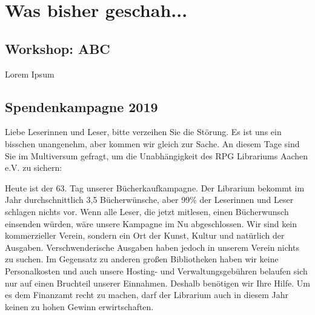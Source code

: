
%



%






%



\makemultititle
%

\section{Was bisher geschah...}

\subsection{Workshop: ABC}
Lorem Ipsum

\subsection{Spendenkampagne 2019}
Liebe Leserinnen und Leser, bitte verzeihen Sie die Störung. Es ist uns ein bisschen unangenehm, aber kommen wir gleich zur Sache. An diesem Tage sind Sie im Multiversum gefragt, um die Unabhängigkeit des RPG Librariums Aachen e.V. zu sichern:

Heute ist der 63. Tag unserer Bücherkaufkampagne. Der Librarium bekommt im Jahr durchschnittlich 3,5 Bücherwünsche, aber 99\% der Leserinnen und Leser schlagen nichts vor. Wenn alle Leser, die jetzt mitlesen, einen Bücherwunsch einsenden würden, wäre unsere Kampagne im Nu abgeschlossen.
Wir sind kein kommerzieller Verein, sondern ein Ort der Kunst, Kultur und natürlich der Ausgaben. Verschwenderische Ausgaben haben jedoch in unserem Verein nichts zu suchen. Im Gegensatz zu anderen großen Bibliotheken haben wir keine Personalkosten und auch unsere Hosting- und Verwaltungsgebühren belaufen sich nur auf einen Bruchteil unserer Einnahmen. Deshalb benötigen wir Ihre Hilfe. Um es dem Finanzamt recht zu machen, darf der Librarium auch in diesem Jahr keinen zu hohen Gewinn erwirtschaften.

